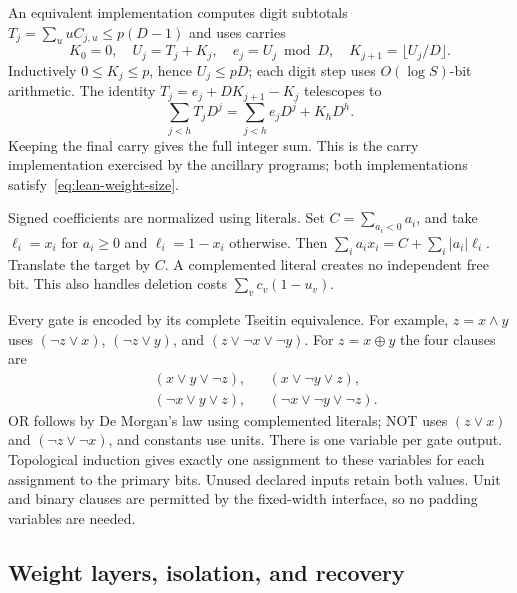 An equivalent implementation computes digit subtotals
$T_j=\sum_u uC_{j,u}\le p(D-1)$ and uses carries
\[
 K_0=0,\quad U_j=T_j+K_j,\quad
 e_j=U_j\bmod D,\quad K_{j+1}=\lfloor U_j/D\rfloor.
\]
Inductively $0\le K_j\le p$, hence $U_j\le pD$; each digit step
uses $O(\log S)$-bit arithmetic. The identity
$T_j=e_j+DK_{j+1}-K_j$ telescopes to
\[
 \sum_{j<h}T_jD^j=\sum_{j<h}e_jD^j+K_hD^h.
\]
Keeping the final carry gives the full integer sum. This is the
carry implementation exercised by the ancillary programs; both
implementations satisfy~\eqref{eq:lean-weight-size}.

Signed coefficients are normalized using literals. Set
$C=\sum_{a_i<0}a_i$, and take $\ell_i=x_i$ for $a_i\ge0$ and
$\ell_i=1-x_i$ otherwise. Then
$\sum_i a_ix_i=C+\sum_i|a_i|\ell_i$. Translate the target by $C$.
A complemented literal creates no independent free bit. This also
handles deletion costs $\sum_v c_v(1-u_v)$.

Every gate is encoded by its complete Tseitin equivalence. For example,
$z=x\wedge y$ uses
$(\neg z\vee x)$, $(\neg z\vee y)$, and
$(z\vee\neg x\vee\neg y)$. For $z=x\oplus y$ the four clauses are
\[
\begin{aligned}
 &(x\vee y\vee\neg z),&& (x\vee\neg y\vee z),\\
 &(\neg x\vee y\vee z),&& (\neg x\vee\neg y\vee\neg z).
\end{aligned}
\]
OR follows by De Morgan's law using complemented literals; NOT uses
$(z\vee x)$ and $(\neg z\vee\neg x)$, and constants use units.
There is one variable per gate output. Topological induction gives
exactly one assignment to these variables for each assignment to the
primary bits. Unused declared inputs retain both values. Unit and
binary clauses are permitted by the fixed-width interface, so no
padding variables are needed.

\subsection{Weight layers, isolation, and recovery}
\label{sec:lean-layers}


